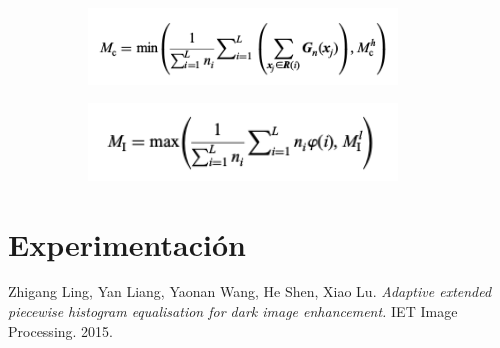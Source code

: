 \documentclass[10pt, a4paper]{article}
\begin{document}
\begin{figure}[H]
	\centering
    \begin{subfigure}{0.5\textwidth}
        \includegraphics[width=0.9\textwidth]{calculo-Mc.png}
    \end{subfigure}\hfill
    \begin{subfigure}{0.5\textwidth}
        \includegraphics[width=0.9\textwidth]{calculo_Mi.png}
    \end{subfigure}\hfill
\end{figure}

\section{Experimentación}


\newpage 

\begin{thebibliography}{9}
Zhigang Ling, Yan Liang, Yaonan Wang, He Shen, Xiao Lu. \textit{Adaptive extended piecewise histogram equalisation for dark image enhancement.} IET Image Processing. 2015.
\end{thebibliography}
\end{document}
